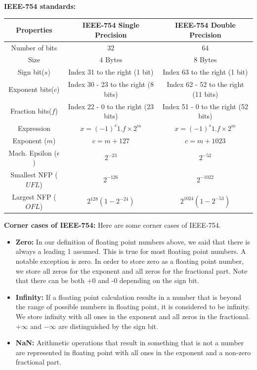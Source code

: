 \documentclass[12pt]{article}
\begin{document}
\medskip
\noindent \textbf{IEEE-754 standards:}
    \begin{center} \renewcommand\arraystretch{2}
        \begin{tabular}{|c|c|c|}
        \hline
           \textbf{Properties} & \textbf{IEEE-754 Single Precision} & \textbf{IEEE-754 Double Precision} \\
           \hline
           Number of bits & 32 & 64  \\
           \hline
           Size & 4 Bytes & 8 Bytes \\
           \hline
           Sign bit($s$) & Index 31 to the right (1 bit) & Index 63 to the right (1 bit)\\
           \hline
           Exponent bits($c$) & Index 30 - 23 to the right (8 bits) & Index 62 - 52 to the right (11 bits)\\
           \hline
           Fraction bits($f$) & Index 22 - 0 to the right (23 bits) & Index 51 - 0 to the right (52 bits)\\
           \hline
           Expression & $x = (-1)^s 1.f \times 2^m$ & $x = (-1)^s 1.f \times 2^m$\\
           \hline
           Exponent ($m$) & $c = m + 127$ & $c=m+1023$ \\
           \hline
           Mach. Epsilon ($\epsilon$) & $2^{-23}$& $2^{-52}$\\
           \hline 
           Smallest NFP ($UFL$) & $2^{-126}$ & $2^{-1022}$\\
           \hline
           Largest NFP ($OFL$) & $2^{128}(1 - 2^{-24})$ & $2^{1024}(1 - 2^{-53})$ \\
           \hline           
        \end{tabular}
    \end{center}
\newpage
\noindent \textbf{Corner cases of IEEE-754:} Here are some corner cases of IEEE-754.
    \begin{itemize}
        \item \textbf{Zero:} In our definition of floating point numbers above, we said that there is always a leading 1 assumed. This is true for most floating point numbers. A notable exception is zero. In order to store zero as a floating point number, we store all zeros for the exponent and all zeros for the fractional part. Note that there can be both +0 and -0 depending on the sign bit.
        \item \textbf{Infinity: }If a floating point calculation results in a number that is beyond the range of possible numbers in floating point, it is considered to be infinity. We store infinity with all ones in the exponent and all zeros in the fractional. $+\infty$ and $-\infty$ are distinguished by the sign bit.
        \item \textbf{NaN:} Arithmetic operations that result in something that is not a number are represented in floating point with all ones in the exponent and a non-zero fractional part.
    \end{itemize}
\end{document}
